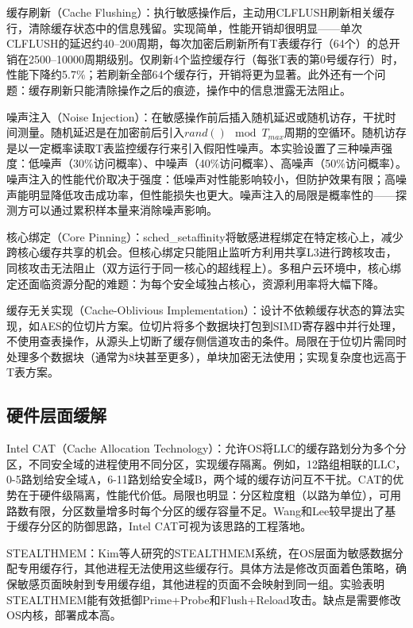 缓存刷新（Cache Flushing）：执行敏感操作后，主动用CLFLUSH刷新相关缓存行，清除缓存状态中的信息残留。实现简单，性能开销却很明显——单次CLFLUSH的延迟约40--200周期，每次加密后刷新所有T表缓存行（64个）的总开销在2500--10000周期级别。仅刷新4个监控缓存行（每张T表的第0号缓存行）时，性能下降约5.7\%；若刷新全部64个缓存行，开销将更为显著。此外还有一个问题：缓存刷新只能清除操作之后的痕迹，操作中的信息泄露无法阻止。

噪声注入（Noise Injection）：在敏感操作前后插入随机延迟或随机访存，干扰时间测量。随机延迟是在加密前后引入$rand() \mod T_{max}$周期的空循环。随机访存是以一定概率读取T表监控缓存行来引入假阳性噪声。本实验设置了三种噪声强度：低噪声（30\%访问概率）、中噪声（40\%访问概率）、高噪声（50\%访问概率）。噪声注入的性能代价取决于强度：低噪声对性能影响较小，但防护效果有限；高噪声能明显降低攻击成功率，但性能损失也更大。噪声注入的局限是概率性的——探测方可以通过累积样本量来消除噪声影响。

核心绑定（Core Pinning）：sched\_setaffinity将敏感进程绑定在特定核心上，减少跨核心缓存共享的机会。但核心绑定只能阻止监听方利用共享L3进行跨核攻击，同核攻击无法阻止（双方运行于同一核心的超线程上）。多租户云环境中，核心绑定还面临资源分配的难题：为每个安全域独占核心，资源利用率将大幅下降。

缓存无关实现（Cache-Oblivious Implementation）：设计不依赖缓存状态的算法实现，如AES的位切片方案。位切片将多个数据块打包到SIMD寄存器中并行处理，不使用查表操作，从源头上切断了缓存侧信道攻击的条件。局限在于位切片需同时处理多个数据块（通常为8块甚至更多），单块加密无法使用；实现复杂度也远高于T表方案。

\subsection{硬件层面缓解}

Intel CAT（Cache Allocation Technology）：允许OS将LLC的缓存路划分为多个分区，不同安全域的进程使用不同分区，实现缓存隔离。例如，12路组相联的LLC，0-5路划给安全域A，6-11路划给安全域B，两个域的缓存访问互不干扰。CAT的优势在于硬件级隔离，性能代价低。局限也明显：分区粒度粗（以路为单位），可用路数有限，分区数量增多时每个分区的缓存容量不足。Wang和Lee较早提出了基于缓存分区的防御思路，Intel CAT可视为该思路的工程落地。

STEALTHMEM：Kim等人研究的STEALTHMEM系统，在OS层面为敏感数据分配专用缓存行，其他进程无法使用这些缓存行。具体方法是修改页面着色策略，确保敏感页面映射到专用缓存组，其他进程的页面不会映射到同一组。实验表明STEALTHMEM能有效抵御Prime+Probe和Flush+Reload攻击。缺点是需要修改OS内核，部署成本高。

